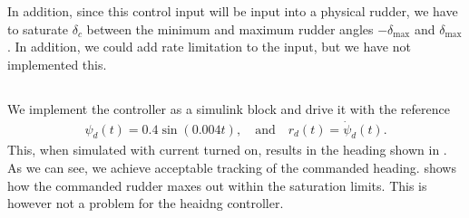 In addition, since this control input will be input into a physical rudder, we have to saturate $\delta_c$ between the minimum and maximum rudder angles $-\delta_{\text{max}}$ and $\delta_{\text{max}}$. In addition, we could add rate limitation to the input, but we have not implemented this.

\subsection{}
We implement the controller as a simulink block and drive it with the reference
\begin{equation}\begin{aligned}
\psi_d(t) = 0.4 \sin (0.004t), \quad \text{and} \quad
r_d(t) = \dot \psi_d(t).
\end{aligned}\end{equation}
This, when simulated with current turned on, results in the heading shown in . As we can see, we achieve acceptable tracking of the commanded heading.  shows how the commanded rudder maxes out within the saturation limits. This is however not a problem for the heaidng controller.

